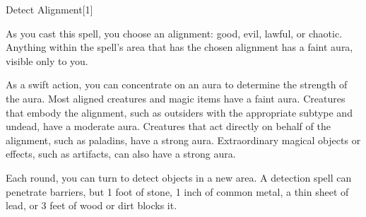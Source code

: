 \begin{spellsection}{Detect Alignment}[1]
    \begin{spellheader}
    \end{spellheader}
    \begin{spellcontent}
        \begin{spelltargetinginfo}
        \end{spelltargetinginfo}
        \begin{spelleffects}
            \spelleffect As you cast this spell, you choose an alignment: good, evil, lawful, or chaotic. Anything within the spell's area that has the chosen alignment has a faint aura, visible only to you.

            As a swift action, you can concentrate on an aura to determine the strength of the aura. Most aligned creatures and magic items have a faint aura. Creatures that embody the alignment, such as outsiders with the appropriate subtype and undead,  have a moderate aura. Creatures that act directly on behalf of the alignment, such as paladins, have a strong aura. Extraordinary magical objects or effects, such as artifacts, can also have a strong aura.
            \spelldur \durshort
        \end{spelleffects}
    \end{spellcontent}
    \begin{spellfooter}
        \spellnotes Each round, you can turn to detect objects in a new area. A detection spell can penetrate barriers, but 1 foot of stone, 1 inch of common metal, a thin sheet of lead, or 3 feet of wood or dirt blocks it.
        \miscastexplode
    \end{spellfooter}
    \begin{spellaugments}
    \end{spellaugments}
\end{spellsection}


